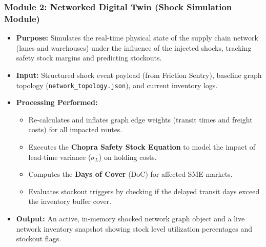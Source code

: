\subsubsection{Module 2: Networked Digital Twin (Shock Simulation Module)}
\begin{itemize}
    \item \textbf{Purpose:} Simulates the real-time physical state of the supply chain network (lanes and warehouses) under the influence of the injected shocks, tracking safety stock margins and predicting stockouts.
    \item \textbf{Input:} Structured shock event payload (from Friction Sentry), baseline graph topology (\texttt{network\_topology.json}), and current inventory logs.
    \item \textbf{Processing Performed:}
    \begin{itemize}
        \item Re-calculates and inflates graph edge weights (transit times and freight costs) for all impacted routes.
        \item Executes the \textbf{Chopra Safety Stock Equation} to model the impact of lead-time variance ($\sigma_L$) on holding costs.
        \item Computes the \textbf{Days of Cover} (DoC) for affected SME markets.
        \item Evaluates stockout triggers by checking if the delayed transit days exceed the inventory buffer cover.
    \end{itemize}
    \item \textbf{Output:} An active, in-memory shocked network graph object and a live network inventory snapshot showing stock level utilization percentages and stockout flags.
\end{itemize}

